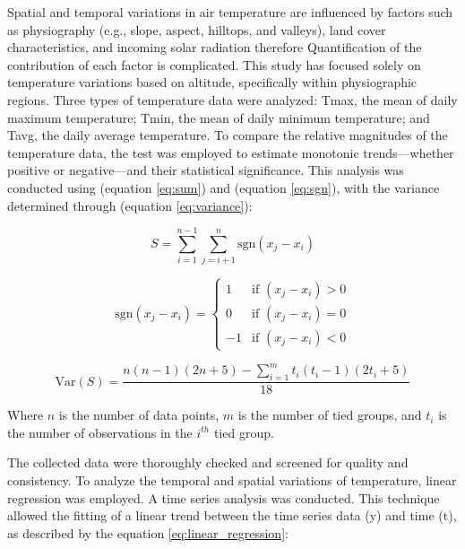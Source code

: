 Spatial and temporal variations in air temperature are influenced by factors such as physiography (e.g., slope, aspect, hilltops, and valleys), land cover characteristics, and incoming solar radiation therefore Quantification of the contribution of each factor is complicated. This study has focused solely on temperature variations based on altitude, specifically within physiographic regions. Three types of temperature data were analyzed: Tmax, the mean of daily maximum temperature; Tmin, the mean of daily minimum temperature; and Tavg, the daily average temperature. To compare the relative magnitudes of the temperature data, the \citet{mann_nonparametric_1945,kendall_rank_1949} test was employed to estimate monotonic trends—whether positive or negative—and their statistical significance. This analysis was conducted using (equation \ref{eq:sum})  and (equation \ref{eq:sgn}), with the variance determined through (equation \ref{eq:variance}):

\begin{equation} 
  S = \sum_{i=1}^{n-1} \sum_{j=i+1}^{n} \text{sgn}(x_j - x_i) \tag{1} 
  \label{eq:sum}
  \end{equation}
  
\begin{equation}
  \text{sgn}(x_j - x_i) = 
  \begin{cases} 
  1 & \text{if } (x_j - x_i) > 0 \\ 
  0 & \text{if } (x_j - x_i) = 0 \\ 
  -1 & \text{if } (x_j - x_i) < 0 
  \end{cases} \tag{2} 
  \label{eq:sgn}
  \end{equation}
  
\begin{equation}
  \text{Var}(S) = \frac{n(n-1)(2n+5) - \sum_{i=1}^{m} t_i(t_i-1)(2t_i+5)}{18} \tag{3}
  \label{eq:variance}
  \end{equation}

Where \( n \) is the number of data points, \( m \) is the number of tied groups, and \( t_i \) is the number of observations in the \( i^{th} \) tied group.

The collected data were thoroughly checked and screened for quality and consistency. To analyze the temporal and spatial variations of temperature, linear regression was employed. A time series analysis was conducted. This technique allowed the fitting of a linear trend between the time series data (y) and time (t), as described by the equation \ref{eq:linear_regression}:

